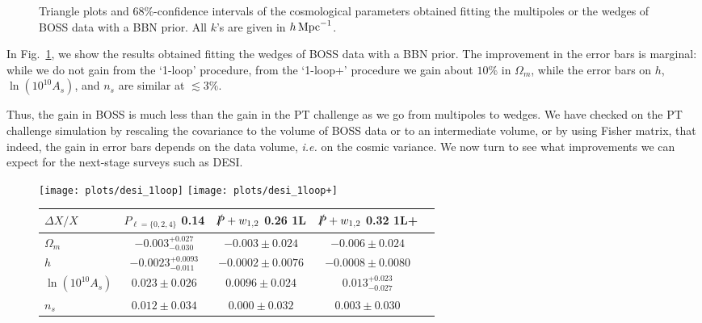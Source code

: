 \documentclass[12pt,a4paper]{article}
\def\hinvMpc{h\,{\rm Mpc}^{-1}}
\def\PA{\slashed{P}}
\renewcommand{\(}{\left(}
\renewcommand{\)}{\right)}
\begin{document}
{\begin{figure}[ht!]
\caption{\small Triangle plots and $68\%$-confidence intervals of the cosmological parameters obtained fitting the multipoles or the wedges of BOSS data with a BBN prior. 
All $k$'s are given in $\hinvMpc$. 
} \label{fig:boss} 
\end{figure}

In Fig.~\ref{fig:boss}, we show the results obtained fitting the wedges of BOSS data with a BBN prior. 
The improvement in the error bars is marginal: while we do not gain from the `1-loop' procedure, from the `1-loop+' procedure we gain about $10\%$ in $\Omega_m$, while the error bars on $h$, $\ln(10^{10}A_s)$, and $n_s$ are similar at $\lesssim 3\%$. 

Thus, the gain in BOSS is much less than the gain in the PT challenge as we go from multipoles to wedges. 
We have checked on the PT challenge simulation by rescaling the covariance to the volume of BOSS data or to an intermediate volume, or by using Fisher matrix, that indeed, the gain in error bars depends on the data volume, {\it i.e.} on the cosmic variance. 
We now turn to see what improvements we can expect for the next-stage surveys such as DESI. 

\begin{figure}[ht!]
\centering
\texttt{[image: plots/desi\_1loop]}
\texttt{[image: plots/desi\_1loop+]}

\scriptsize
    \begin{tabular}{|l|c|c|c|c|}
     \hline 
    $\Delta X / X$ & $P_{\ell=\{0,2,4\}}$ 0.14 				&  $\PA +  w_{1,2}$ 0.26 1L 		&  $\PA +  w_{1,2}$ 0.32 1L+ \\ \hline 
    $\Omega_{m }$ & $-0.003^{+0.027}_{-0.030} $ 	& $-0.003\pm 0.024 $ 			& $-0.006\pm 0.024           $ \\ 
    $ h$ & $-0.0023^{+0.0093}_{-0.011}$  			& $-0.0002\pm 0.0076  $ 			& $-0.0008\pm 0.0080         $\\ 
    $\ln (10^{10}A_s)$ & $0.023\pm 0.026$  		& $0.0096\pm 0.024 			$ 	& $0.013^{+0.023}_{-0.027}   $ \\ 
    $ n_s$ & $0.012\pm 0.034 $					& $0.000\pm 0.032  $			& $0.003\pm 0.030            $\\
    \hline 
    \end{tabular}
    

\end{figure}}
\end{document}
